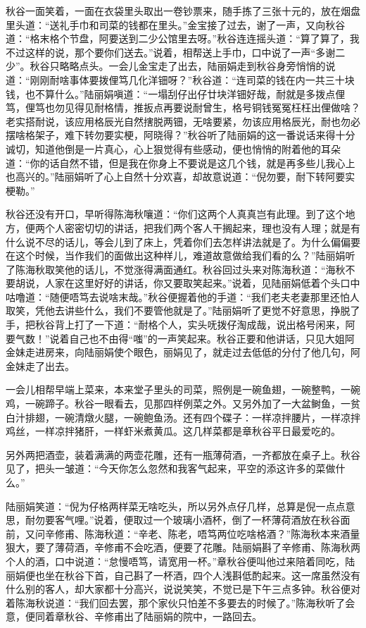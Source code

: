 \documentclass[12pt,UTF8]{ctexbook}
\begin{document}
{{{秋谷一面笑着，一面在衣袋里头取出一卷钞票来，随手拣了三张十元的，放在烟盘里头道：“送礼手巾和司菜的钱都在里头。”金宝接了过去，谢了一声，又向秋谷道：“格末格个节盘，阿要送到二少公馆里去呀。”秋谷连连摇头道：“算了算了，我不过这样的说，那个要你们送去。”说着，相帮送上手巾，口中说了一声“多谢二少”。秋谷只略略点头。一会儿金宝走了出去，陆丽娟走到秋谷身旁悄悄的说道：“刚刚耐啥事体要拨俚笃几化洋钿呀？”秋谷道：“连司菜的钱在内一共三十块钱，也不算什么。”陆丽娟嗔道：“一塌刮仔出仔廿块洋钿好哉，耐就是多拨点俚笃，俚笃也勿见得见耐格情，推扳点再要说耐曾生，格号铜钱冤冤枉枉出俚做啥？老实搭耐说，该应用格辰光自然搳脱两钿，无啥要紧，勿该应用格辰光，耐也勿必摆啥格架子，难下转勿要实梗，阿晓得？”秋谷听了陆丽娟的这一番说话来得十分诚切，知道他倒是一片真心，心上狠觉得有些感动，便也悄悄的附着他的耳朵道：“你的话自然不错，但是我在你身上不要说是这几个钱，就是再多些儿我心上也高兴的。”陆丽娟听了心上自然十分欢喜，却故意说道：“倪勿要，耐下转阿要实梗勒。”

秋谷还没有开口，早听得陈海秋嚷道：“你们这两个人真真岂有此理。到了这个地方，便两个人密密切切的讲话，把我们两个客人干搁起来，理也没有人理；就是有什么说不尽的话儿，等会儿到了床上，凭着你们去怎样讲法就是了。为什么偏偏要在这个时候，当作我们的面做出这种样儿，难道故意做给我们看的么？”陆丽娟听了陈海秋取笑他的话儿，不觉涨得满面通红。秋谷回过头来对陈海秋道：“海秋不要胡说，人家在这里好好的讲话，你又要取笑起来。”说着，见陆丽娟低着个头口中咕噜道：“随便唔笃去说啥末哉。”秋谷便握着他的手道：“我们老夫老妻那里还怕人取笑，凭他去讲些什么，我们不要管他就是了。”陆丽娟听了更觉不好意思，挣脱了手，把秋谷背上打了一下道：“耐格个人，实头呒拨仔淘成哉，说出格号闲来，阿要气数！”说着自己也不由得“嗤”的一声笑起来。秋谷正要和他讲话，只见大姐阿金妹走进房来，向陆丽娟使个眼色，丽娟见了，就走过去低低的分付了他几句，阿金妹走了出去。

一会儿相帮早端上菜来，本来堂子里头的司菜，照例是一碗鱼翅，一碗整鸭，一碗鸡，一碗蹄子。秋谷一眼看去，见那四样例菜之外。又另外加了一大盆鲥鱼，一贫白汁排翅，一碗清燉火腿，一碗鲍鱼汤。还有四个碟子：一样凉拌腰片，一样凉拌鸡丝，一样凉拌猪肝，一样虾米煮黄瓜。这几样菜都是章秋谷平日最爱吃的。

另外两把酒壶，装着满满的两壶花雕，还有一瓶薄荷酒，一齐都放在桌子上。秋谷见了，把头一皱道：“今天你怎么忽然和我客气起来，平空的添这许多的菜做什么。”

陆丽娟笑道：“倪为仔格两样菜无啥吃头，所以另外点仔几样，总算是倪一点点意思，耐勿要客气哩。”说着，便取过一个玻璃小酒杯，倒了一杯薄荷酒放在秋谷面前，又问辛修甫、陈海秋道：“辛老、陈老，唔笃两位吃啥格酒？”陈海秋本来酒量狠大，要了薄荷酒，辛修甫不会吃酒，便要了花雕。陆丽娟斟了辛修甫、陈海秋两个人的酒，口中说道：“怠慢唔笃，请宽用一杯。”章秋谷便叫他过来陪着同吃，陆丽娟便也坐在秋谷下首，自己斟了一杯酒，四个人浅斟低酌起来。这一席虽然没有什么别的客人，却大家都十分高兴，说说笑笑，不觉已是下午三点多钟。秋谷便对着陈海秋说道：“我们回去罢，那个家伙只怕差不多要去的时候了。”陈海秋听了会意，便同着章秋谷、辛修甫出了陆丽娟的院中，一路回去。

}}}
\end{document}
